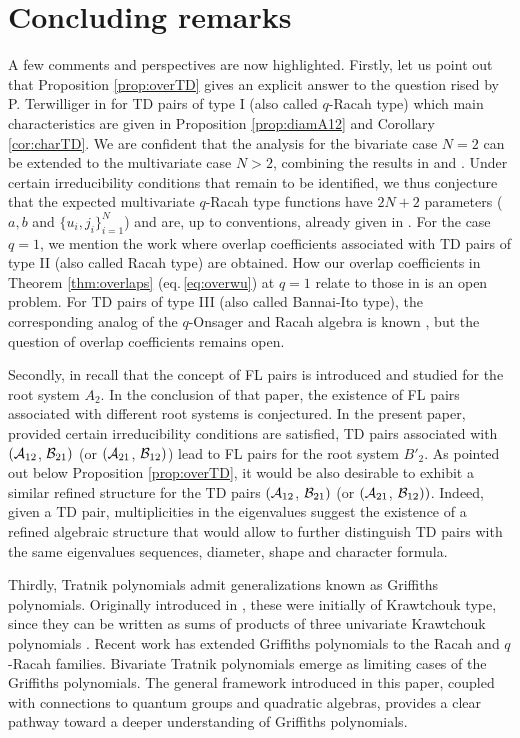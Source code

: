\documentclass[11pt]{amsart}
\numberwithin{equation}{section}
\numberwithin{equation}{section}
\begin{document}
 \section{Concluding remarks} 
 A few comments and perspectives are now highlighted.
Firstly, let us point out that Proposition \ref{prop:overTD} gives an explicit answer to the question rised by P. Terwilliger in \cite[Above Problem 2.3]{Ter03} for TD pairs of type I (also called $q$-Racah type) which main characteristics are given in Proposition \ref{prop:diamA12} and Corollary \ref{cor:charTD}. We are confident that the analysis for the bivariate case $N=2$ can be extended to the multivariate case $N>2$, combining the results in \cite{IT10} and \cite{BVZ16}. Under certain irreducibility conditions that remain to be identified, we thus conjecture that the expected multivariate $q$-Racah type functions have  $2N+2$ parameters ($a,b$ and $\{u_i,j_i\}_{i=1}^{N}$) and are, up to conventions, already given in \cite{BVZ16}. For the case $q=1$, we mention the work \cite{CGT25} where overlap coefficients associated with TD pairs of type II (also called Racah type) are obtained. How our overlap coefficients in Theorem \ref{thm:overlaps} (eq.\,\eqref{eq:overwu}) at $q=1$ relate to those in \cite[Thm.\,5.1]{CGT25} is an open problem. For TD pairs of type III (also called Bannai-Ito type), the corresponding analog of the $q$-Onsager and Racah algebra  \cite{GZ88} is  known \cite{BGTVZ14}, but the question of overlap coefficients remains open.

Secondly, in \cite{CZ23} recall that
the concept of FL pairs is introduced  and studied for the root system $A_2$. 
In the conclusion of that paper, the existence of FL pairs associated with different root systems is conjectured. In the present paper, provided certain irreducibility conditions are satisfied,   TD pairs associated with $({\cal A}_{12}$, ${\cal B}_{21})$ (or $({\cal A}_{21}$, ${\cal B}_{12})$) lead to FL pairs for the root system $B'_2$.  As pointed out below Proposition \ref{prop:overTD}, it would be also desirable to exhibit a similar refined structure for the TD pairs $({\cal A}_{12}$, ${\cal B}_{21})$ (or $({\cal A}_{21}$, ${\cal B}_{12}))$. Indeed, given a TD pair, multiplicities in the eigenvalues suggest the existence of a refined algebraic structure that would allow to further distinguish TD pairs with the same eigenvalues sequences, diameter, shape and character formula.  

Thirdly, Tratnik polynomials admit generalizations known as Griffiths polynomials. Originally introduced in \cite{G71}, these were initially of Krawtchouk type, since they can be written as sums of products of three univariate Krawtchouk polynomials \cite{GVZ13}. Recent work has extended Griffiths polynomials to the Racah \cite{CFR23,CFGRVZ24} and $q$-Racah \cite{CFGR25} families. Bivariate Tratnik polynomials emerge as limiting cases of the Griffiths polynomials. The general framework introduced in this paper, coupled with connections to quantum groups and quadratic algebras, provides a clear pathway toward a deeper understanding of Griffiths polynomials.
\end{document}
